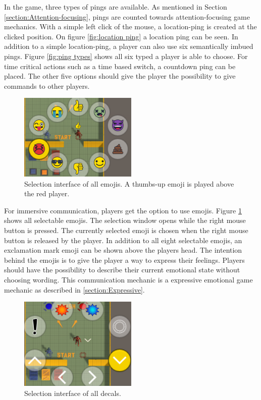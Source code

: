 In the game, three types of pings are available. As mentioned in
Section \ref{section:Attention-focusing}, pings are counted towards attention-focusing game mechanics. With a simple left click of the mouse, a location-ping is created at the clicked position. On figure \ref{fig:location ping} a location ping can be seen.
In addition to a simple location-ping, a player can also use six semantically imbued pings. Figure \ref{fig:ping types} shows all six typed a player is able to choose. For time critical actions such as a time based switch, a countdown ping can be placed. The other five options should give the player the possibility to give commands to other players. 


\begin{figure}
    \centering
    \includegraphics[width=0.5\textwidth]{images/emoji_selection.png}
    \caption{Selection interface of all emojis. A thumbs-up emoji is played above the red player.}
    \label{fig:emoji selection}
\end{figure}

For immersive communication, players get the option to use emojis.
Figure \ref{fig:emoji selection} shows all selectable emojis. The selection window opens while the right mouse button is pressed. The currently selected emoji is chosen when the right mouse button is released by the player.
In addition to all eight selectable emojis, an exclamation mark emoji can be shown above the players head. The intention behind the emojis is to give the player a way to express their feelings. Players should have the possibility to describe their current emotional state without choosing wording. This communication mechanic is a expressive emotional game mechanic as described in \ref{section:Expressive}.


\begin{figure}
    \centering
    \includegraphics[width=0.5\textwidth]{images/decal_selection.png}
    \caption{Selection interface of all decals.}
    \label{fig:decal selection}
\end{figure}

